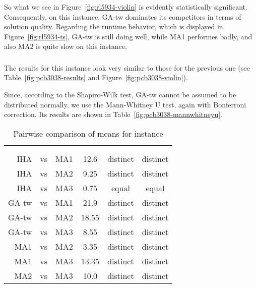 \documentclass[thesis.tex]{subfiles}
\begin{document}
So what we see in Figure~\vref{fig:rl5934-violin} is evidently statistically significant. Consequently, on this instance, \gls{GA-tw} dominates its competitors in terms of solution quality. Regarding the runtime behavior, which is displayed in Figure~\vref{fig:rl5934-ts}, \gls{GA-tw} is still doing well, while \gls{MA1} performes badly, and also \gls{MA2} is quite slow on this instance.
\subsubsection{}
   \renewcommand{\CurrentInstance}{\Instance{pcb3038}}
   \renewcommand{\CurrentInstanceFileEscaped}{pcb3038}
   \renewcommand{\CurrentInstanceTexEscaped}{pcb3038}



The results for this instance look very similar to those for the previous one (see Table~\vref{fig:pcb3038-results} and Figure~\vref{fig:pcb3038-violin}).

Since, according to the Shapiro-Wilk test, \gls{GA-tw} cannot be assumed to be distributed normally, we use the Mann-Whitney U test, again with Bonferroni correction. Its results are shown in Table~\vref{fig:pcb3038-mannwhitneyu}.
\begin{table}[htbp]
   \caption{Pairwise comparison of means for instance \CurrentInstance}
   \label{fig:\CurrentInstanceFileEscaped-mannwhitneyu}
   \centering\small
      \begin{tabular}{r@{\ }c@{\ }l S[table-format=2.2] c c} \toprule
         &&&                          &  \\ \cmidrule(lr){5-6}
         &&&  &  &  \\ \midrule

         \gls{IHA} &vs& \gls{MA1}   & 12.6  & distinct & distinct \\
         \gls{IHA} &vs& \gls{MA2}   &  9.25 & distinct & distinct \\
         \gls{IHA} &vs& \gls{MA3}   &  0.75 &  equal   &  equal   \\
         \gls{GA-tw} &vs& \gls{MA1} & 21.9  & distinct & distinct \\
         \gls{GA-tw} &vs& \gls{MA2} & 18.55 & distinct & distinct \\
         \gls{GA-tw} &vs& \gls{MA3} &  8.55 & distinct & distinct \\
         \gls{MA1} &vs& \gls{MA2}   &  3.35 & distinct & distinct \\
         \gls{MA1} &vs& \gls{MA3}   & 13.35 & distinct & distinct \\
         \gls{MA2} &vs& \gls{MA3}   & 10.0  & distinct & distinct \\
         \bottomrule
      \end{tabular}
\end{table}
\clearpage
\end{document}
